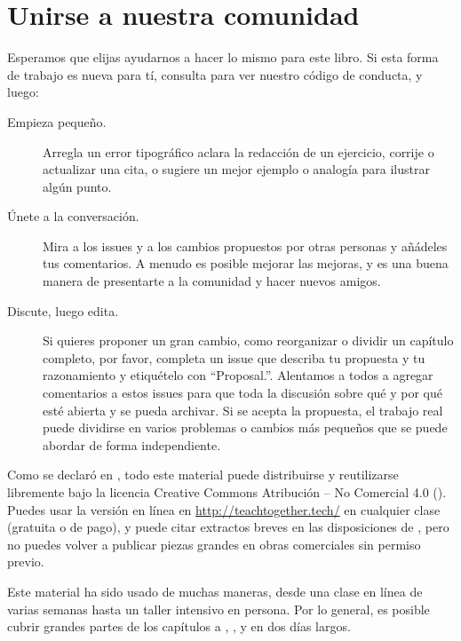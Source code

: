 \chapter{Unirse a nuestra comunidad}\label{s:joining}

Esperamos que elijas ayudarnos a hacer lo mismo para este libro.
Si esta forma de trabajo es nueva para tí,
consulta  para ver nuestro código de conducta,
y luego:

\begin{description}

\item[Empieza pequeño.]
  Arregla un error tipográfico
  aclara la redacción de un ejercicio,
  corrije o actualizar una cita,
  o sugiere un mejor ejemplo o analogía para ilustrar algún punto.

\item[Únete a la conversación.]
  Mira a los issues y a los cambios propuestos por otras personas
  y añádeles tus comentarios.
  A menudo es posible mejorar las mejoras,
  y es una buena manera de presentarte a la comunidad y hacer nuevos amigos.

\item[Discute, luego edita.]
  Si quieres proponer un gran cambio,
  como reorganizar o dividir un capítulo completo,
  por favor, completa un issue que describa tu propuesta y tu razonamiento y etiquételo con ``Proposal.''.
  Alentamos a todos a agregar comentarios a estos issues
  para que toda la discusión sobre qué y por qué esté abierta y se pueda archivar.
  Si se acepta la propuesta,
  el trabajo real puede dividirse en varios problemas o cambios más pequeños
  que se puede abordar de forma independiente.
\end{description}


Como se declaró en ,
todo este material puede distribuirse y reutilizarse libremente
bajo la licencia Creative Commons Atribución – No Comercial 4.0
().
Puedes usar la versión en línea en \url{http://teachtogether.tech/} en cualquier clase (gratuita o de pago),
y puede citar extractos breves en las disposiciones de ,
pero no puedes volver a publicar piezas grandes en obras comerciales sin permiso previo.

Este material ha sido usado de muchas maneras,
desde una clase en línea de varias semanas hasta un taller intensivo en persona.
Por lo general, es posible cubrir grandes partes de los capítulos  a ,
,
y  en dos días largos.

